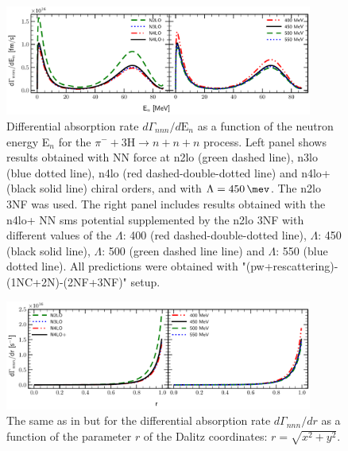     \begin{figure}[h]
        \begin{center}
        \includegraphics[width=0.9\textwidth]{PlotData/PION/Dalitz_maps/figures/3H_dGdEn.pdf}
        \end{center}
        \caption{Differential absorption rate $d\Gamma_{nnn} /d\text{E}_n$ 
        as a function of the neutron energy E$_n$ for the 
        $\pi^- + 3\text{H} \rightarrow n + n + n$ process.
        Left panel shows results obtained with NN force at \gls{n2lo} (green dashed line),
        \gls{n3lo} (blue dotted line), \gls{n4lo} (red dashed-double-dotted line)
        and \gls{n4lo+} (black solid line) chiral orders, and with $\Lambda = \SI{450}{\mev}$.
        The \gls{n2lo} 3NF was used.
        The right panel includes results obtained with the \gls{n4lo+} NN \gls{sms} potential
        supplemented by the \gls{n2lo} 3NF
        with different values of the $\Lambda$: \SI{400}{\mev} (red dashed-double-dotted line),
        $\Lambda$: \SI{450}{\mev} (black solid line),
        $\Lambda$: \SI{500}{\mev} (green dashed line line) and
        $\Lambda$: \SI{550}{\mev} (blue dotted line).
        All predictions were obtained with "(\gls{pw}+rescattering)-(1NC+2N)-(2NF+3NF)" setup.}
        \label{pion_dGdEn_3H}
    \end{figure}

    \begin{figure}[h]
        \begin{center}
        \includegraphics[width=0.9\textwidth]{PlotData/PION/Dalitz_maps/figures/3H_dGdr.pdf}
        \end{center}
        \caption{The same as in  but for the differential absorption rate $d\Gamma_{nnn} /dr$
        as a function of the parameter $r$ of the Dalitz coordinates: $r = \sqrt{x^2 + y^2}$.}
        \label{pion_dGdr_3H}
    \end{figure}


